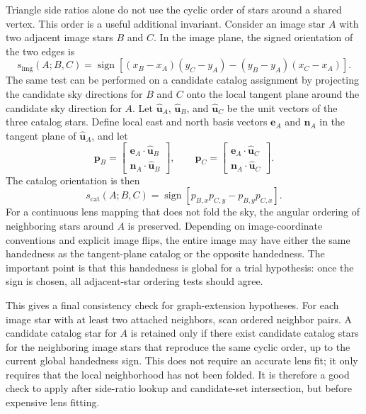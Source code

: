 \documentclass[11pt]{article}
\begin{document}
Triangle side ratios alone do not use the cyclic order of stars around a
shared vertex. This order is a useful additional invariant. Consider an image
star \(A\) with two adjacent image stars \(B\) and \(C\). In the image plane,
the signed orientation of the two edges is
\begin{equation}
  s_{\mathrm{img}}(A;B,C) =
  \operatorname{sign}\left[
    (x_B-x_A)(y_C-y_A) - (y_B-y_A)(x_C-x_A)
  \right].
\end{equation}
The same test can be performed on a candidate catalog assignment by projecting
the candidate sky directions for \(B\) and \(C\) onto the local tangent plane
around the candidate sky direction for \(A\). Let
\(\hat{\mathbf{u}}_A\), \(\hat{\mathbf{u}}_B\), and \(\hat{\mathbf{u}}_C\)
be the unit vectors of the three catalog stars. Define local east and north
basis vectors \(\mathbf{e}_A\) and \(\mathbf{n}_A\) in the tangent plane of
\(\hat{\mathbf{u}}_A\), and let
\begin{equation}
  \mathbf{p}_B =
  \begin{bmatrix}
    \mathbf{e}_A\cdot\hat{\mathbf{u}}_B\\
    \mathbf{n}_A\cdot\hat{\mathbf{u}}_B
  \end{bmatrix},
  \qquad
  \mathbf{p}_C =
  \begin{bmatrix}
    \mathbf{e}_A\cdot\hat{\mathbf{u}}_C\\
    \mathbf{n}_A\cdot\hat{\mathbf{u}}_C
  \end{bmatrix}.
\end{equation}
The catalog orientation is then
\begin{equation}
  s_{\mathrm{cat}}(A;B,C) =
  \operatorname{sign}\left[
    p_{B,x}p_{C,y} - p_{B,y}p_{C,x}
  \right].
\end{equation}
For a continuous lens mapping that does not fold the sky, the angular ordering
of neighboring stars around \(A\) is preserved. Depending on image-coordinate
conventions and explicit image flips, the entire image may have either the
same handedness as the tangent-plane catalog or the opposite handedness. The
important point is that this handedness is global for a trial hypothesis: once
the sign is chosen, all adjacent-star ordering tests should agree.

This gives a final consistency check for graph-extension hypotheses. For each
image star with at least two attached neighbors, scan ordered neighbor pairs.
A candidate catalog star for \(A\) is retained only if there exist candidate
catalog stars for the neighboring image stars that reproduce the same cyclic
order, up to the current global handedness sign. This does not require an
accurate lens fit; it only requires that the local neighborhood has not been
folded. It is therefore a good check to apply after side-ratio lookup and
candidate-set intersection, but before expensive lens fitting.
\end{document}

